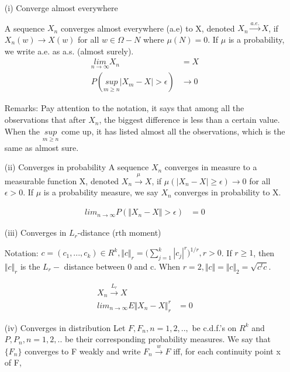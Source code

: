 \begin{itemize}
	\item [(i)] Converge almost everywhere
	
	A sequence $X_n$ converges almost everywhere (a.e) to X, denoted $X_n \xrightarrow {a.e.} X $, if $X_n(w) \rightarrow X(w)$ for all $w \in \Omega - N$ where $\mu(N) = 0$. If $\mu$ is a probability, we write a.e. as a.s. (almost surely). 
\begin{align*}
	\underset{n \rightarrow \infty}{lim} X_n &= X \\
	P(\underset{m \geq n}{sup} \Big | X_m - X \Big | > \epsilon) & \rightarrow 0
\end{align*}
	
Remarks: Pay attention to the notation, it says that among all the observations that after $X_n$, the biggest difference is less than a certain value. When the $\underset{m \geq n}{sup}$ come up, it has listed almost all the observations, which is the same as almost sure. 
	
	\item[(ii)] Converges in probability
A sequence $X_n$ converges in measure to a measurable function X, denoted $X_n \xrightarrow {\mu} X$, if $\mu(|X_n - X| \geq \epsilon) \rightarrow 0$ for all $\epsilon > 0$. If $\mu$ is a probability measure, we say $X_n$ converges in probability to X.

\begin{align*}
	lim_{n \rightarrow \infty} P(\Vert X_n -X \Vert > \epsilon)&= 0
\end{align*}

\item[(iii)] Converges in $L_r$-distance (rth moment)

Notation: $c= (c_1, ... , c_k) \in R^k, \Vert c \Vert_r = \Big( \sum_{j=1}^k | c_j |^r \Big)^{1/r}, r> 0$. If $r \geq 1$, then $\Vert  c \Vert_r $ is the $L_r-$ distance between 0 and c. When $r= 2, \Vert  c \Vert = \Vert c \Vert _2 = \sqrt{c^t c}$.

\begin{align*}
	X_n \xrightarrow {L_r} X \\
	lim_{n \rightarrow \infty} E \Vert  X_n -X \Vert _{r}^{r}&= 0
\end{align*}

\item[(iv)] Converges in distribution
Let $F, F_n, n= 1,2,..,$ be c.d.f.'s on $R^k$ and $P, P_n, n=1,2,..$ be their corresponding probability measures. 
We say that $\{ F_n\}$ converges to F weakly and write $F_n \xrightarrow {w} F$ iff, for each continuity point x of F, 


\end{itemize}
